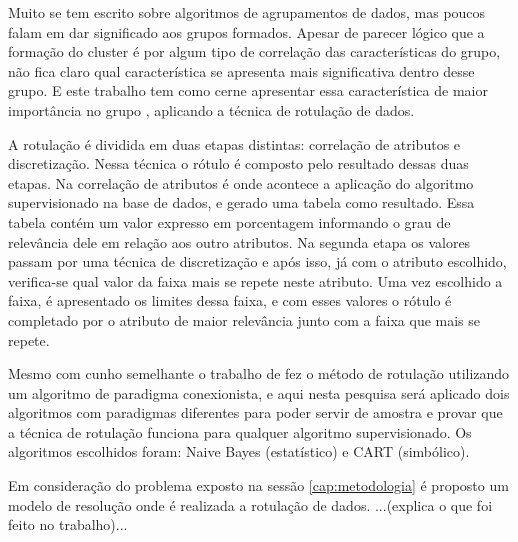 Muito se tem escrito sobre algoritmos de agrupamentos de dados, mas poucos falam em dar significado aos grupos formados. Apesar de parecer  lógico que a formação do cluster é por algum tipo de correlação das características do grupo, não fica claro qual característica se apresenta mais significativa dentro desse grupo. E este trabalho tem como cerne apresentar essa característica de maior importância no grupo , aplicando a técnica de rotulação de dados.

A rotulação é dividida em duas etapas distintas: correlação de atributos e discretização. Nessa técnica o rótulo é composto pelo resultado dessas duas etapas. Na correlação de atributos é onde acontece a aplicação do algoritmo supervisionado na base de dados, e gerado uma tabela como resultado. Essa tabela contém um valor expresso em porcentagem informando o grau de relevância dele em relação aos outro atributos. Na segunda etapa os valores passam por uma técnica de discretização e após isso, já com o atributo escolhido, verifica-se qual valor da faixa mais se repete neste atributo. Uma vez escolhido a faixa, é apresentado os limites dessa faixa, e com esses valores o rótulo é completado por o atributo de maior relevância junto com a faixa que mais se repete. 

Mesmo com cunho semelhante o trabalho de \cite{Lopes} fez o método de rotulação utilizando um algoritmo de paradigma conexionista, e aqui nesta pesquisa será aplicado dois algoritmos com paradigmas diferentes para poder servir de amostra e provar que a técnica de rotulação funciona para qualquer algoritmo supervisionado. Os algoritmos escolhidos foram: Naive Bayes (estatístico) e CART (simbólico).

Em consideração do problema exposto na sessão \ref{cap:metodologia} é proposto um modelo de resolução onde é realizada a rotulação de dados. 
...(explica o que foi feito no trabalho)...



